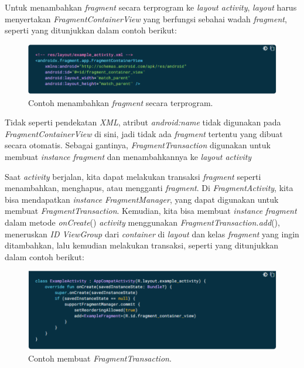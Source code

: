 \begin{enumerate}
\begin{enumerate}
	Untuk menambahkan \textit{fragment} secara terprogram ke \textit{layout activity}, \textit{layout} harus menyertakan \textit{FragmentContainerView} yang berfungsi sebahai wadah \textit{fragment}, seperti yang ditunjukkan dalam contoh berikut:
\begin{figure}[H]
	\centering
	\includegraphics[keepaspectratio, width=12cm]{gambar/fragment_add1}
	\caption{Contoh menambahkan \textit{fragment} secara terprogram. \citep{developerandroid}}
	\label{gambar:gambar_33}
\end{figure}
	Tidak seperti pendekatan \textit{XML}, atribut \textit{android:name} tidak digunakan pada \textit{FragmentContainerView} di sini, jadi tidak ada \textit{fragment} tertentu yang dibuat secara otomatis. Sebagai gantinya, \textit{FragmentTransaction} digunakan untuk membuat \textit{instance fragment} dan menambahkannya ke \textit{layout activity}
	\end{enumerate}
Saat \textit{activity} berjalan, kita dapat melakukan transaksi \textit{fragment} seperti menambahkan, menghapus, atau mengganti \textit{fragment}. Di \textit{FragmentActivity}, kita bisa mendapatkan \textit{instance FragmentManager}, yang dapat digunakan untuk membuat \textit{FragmentTransaction}. Kemudian, kita bisa membuat \textit{instance fragment} dalam metode \textit{onCreate}() \textit{activity} menggunakan \textit{FragmentTransaction.add}(), meneruskan \textit{ID ViewGroup} dari \textit{container} di \textit{layout} dan kelas \textit{fragment} yang ingin ditambahkan, lalu kemudian melakukan transaksi, seperti yang ditunjukkan dalam contoh berikut:
\begin{figure}[H]
	\centering
	\includegraphics[keepaspectratio, width=12cm]{gambar/fragment_add2}
	\caption{Contoh membuat \textit{FragmentTransaction}. \citep{developerandroid}}
	\label{gambar:gambar_34}
\end{figure}

\end{enumerate}
